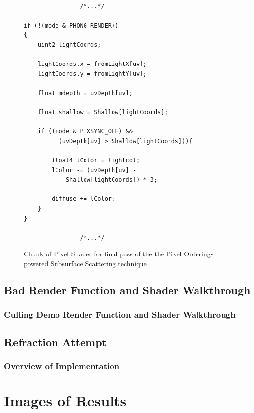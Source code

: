 \documentclass[a4paper, 12pt]{article}
\begin{document}
\begin{figure}[h]
\begin{lstlisting}[language=HLSL]

			    /*...*/

if (!(mode & PHONG_RENDER))
{
	uint2 lightCoords;

	lightCoords.x = fromLightX[uv];
	lightCoords.y = fromLightY[uv];

	float mdepth = uvDepth[uv];

	float shallow = Shallow[lightCoords];

	if ((mode & PIXSYNC_OFF) && 
		  (uvDepth[uv] > Shallow[lightCoords])){

		float4 lColor = lightcol;
		lColor -= (uvDepth[uv] - 
			Shallow[lightCoords]) * 3;
			
		diffuse += lColor;
	}
}

			    /*...*/

\end{lstlisting}
\caption{Chunk of Pixel Shader for final pass of the the Pixel Ordering-powered Subsurface Scattering technique}
\label{code:SSSFinal}
\end{figure}



\subsection{Bad Render Function and Shader Walkthrough}

\label{subsubsection:BadRender}

\subsubsection{Culling Demo Render Function and Shader Walkthrough}

\subsection{Refraction Attempt}

\label{subsection:RefractionAttemptImplementation}

\subsubsection{Overview of Implementation}


\section{Images of Results}
\end{document}
